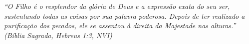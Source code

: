 \documentclass[
	12pt,				%
	openright,			%
	oneside,			%
	a4paper,			%
	tccpreliminar,		%
	]{ABNT-DC-UEL}
\begin{document}
\begin{epigrafe}
  \vspace*{\fill}
  \hspace{.4\textwidth}
  \begin{minipage}{.5\textwidth}   
    \begin{flushright}
	\textit{
    ``O Filho é o resplendor da glória de Deus e a expressão exata do seu ser, sustentando todas as coisas por sua palavra poderosa. Depois de ter realizado a purificação dos pecados, ele se assentou à direita da Majestade nas alturas.''\\
    (Bíblia Sagrada, Hebreus 1:3, NVI)}
    \end{flushright}
  \end{minipage}
\end{epigrafe}

\end{document}
